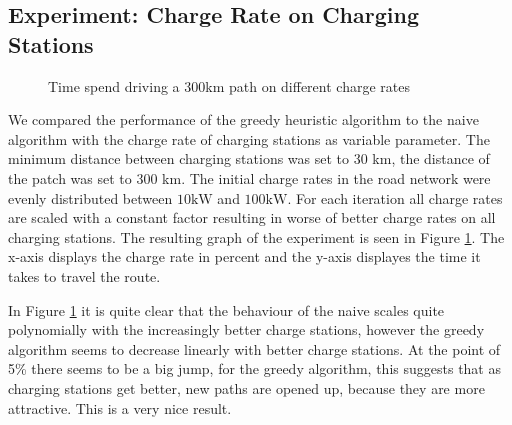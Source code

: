 \subsection{Experiment: Charge Rate on Charging Stations}

\begin{figure}
\centering
{}
\caption{Time spend driving a 300km path on different charge rates} 
\label{fig:charge_rate}
\end{figure}

We compared the performance of the greedy heuristic algorithm to the naive algorithm with the charge rate of charging stations as variable parameter. The minimum distance between charging stations was set to 30 km, the distance of the patch was set to 300 km. The initial charge rates in the road network were evenly distributed between $10 \si{\kW}$ and $100 \si{\kW}$. For each iteration all charge rates are scaled with a constant factor resulting in worse of better charge rates on all charging stations. The resulting graph of the experiment is seen in Figure \ref{fig:charge_rate}. The x-axis displays the charge rate in percent and the y-axis displayes the time it takes to travel the route.

In Figure \ref{fig:charge_rate} it is quite clear that the behaviour of the naive scales quite polynomially with the increasingly better charge stations, however the greedy algorithm seems to decrease linearly with better charge stations. At the point of 5\% there seems to be a big jump, for the greedy algorithm, this suggests that as charging stations get better, new paths are opened up, because they are more attractive. This is a very nice result. 